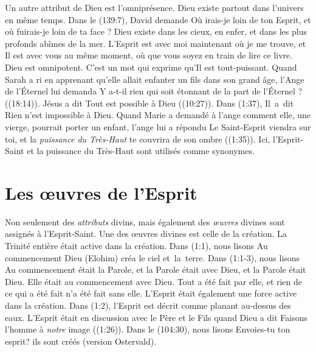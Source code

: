 Un autre attribut de Dieu est l'omniprésence. Dieu existe partout dans
 l'univers en même temps. Dans le (139:7), David demande\frcolon{}
 \Og Où irais-je loin de ton Esprit, et où fuirais-je loin de ta face ? \Fg{}
 Dieu existe dans les cieux, en enfer, et dans les plus profonds abîmes de
 la mer. L'Esprit est avec moi maintenant où je me trouve, et Il est avec vous
 au même moment, où que vous soyez en train de lire ce livre. Dieu est omnipotent.
 C'est un mot qui exprime qu'Il est tout-puissant. Quand Sarah a ri en apprenant
 qu'elle allait enfanter un fils dans son grand âge, l'Ange de l'Éternel lui demanda\frcolon{}
 \Og Y a-t-il rien qui soit étonnant de la part de l'Éternel ? \Fg{}
 ((18:14)). Jésus a dit\frcolon{} \Og Tout est possible à Dieu \Fg{}
 ((10:27)). Dans (1:37), Il~a~dit\frcolon{}
 \Og Rien n'est impossible à Dieu. \Fg{} Quand Marie a demandé à l'ange comment
 elle, une vierge, pourrait porter un enfant, l'ange lui a répondu\frcolon{}
 \Og Le Saint-Esprit viendra sur toi, et la \emph{puissance du Très-Haut} te couvrira
 de son ombre \Fg{} ((1:35)). Ici, l'Esprit-Saint et
 la puissance du Très-Haut sont utilisés comme synonymes.

\section{Les \oe{}uvres de l'Esprit}

Non seulement des \emph{attributs} divins, mais également des \emph{\oe{}uvres}
 divines sont assignés à l'Esprit-Saint.
 Une des œuvres divines est celle de la création.
 La Trinité entière était active dans la création.
 Dans (1:1), nous lisons\frcolon{}
 \Og Au commencement Dieu (Elohim) créa le ciel et~la~terre. \Fg{}
 Dans (1:1-3), nous lisons\frcolon{}
 \Og Au commencement était la Parole, et la Parole était avec Dieu,
 et la Parole était Dieu. Elle était au commencement avec Dieu.
 Tout a été fait par elle, et rien de ce qui a été fait n'a été fait
 sans elle. \Fg{}
 L'Esprit était également une force active dans la création.
 Dans (1:2), l'Esprit est décrit comme planant au-dessus
 des eaux. L'Esprit était en discussion avec le Père et le Fils quand
 Dieu a dit\frcolon{} \Og Faisons l'homme à \emph{notre} image \Fg{} ((1:26)).
 Dans le (104:30), nous lisons\frcolon{}
 \Og Envoies-tu ton esprit? ils sont créés \Fg{} (version Ostervald).

